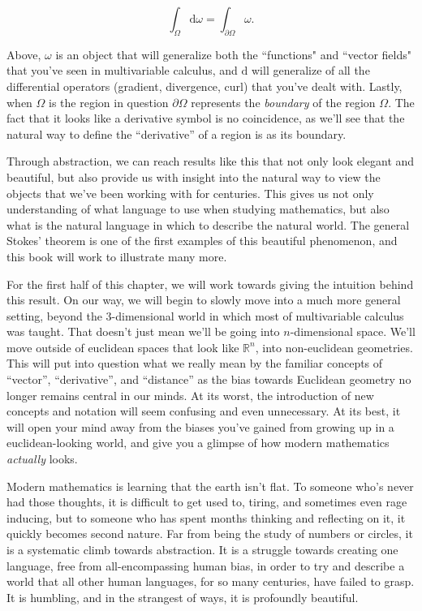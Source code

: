 \documentclass[../master.tex]{subfiles}
\begin{document}
	\begin{equation} \label{eq:GeneralStokes}
		\int_\Omega \mathrm d \omega = \int_{\partial \Omega} \omega.
	\end{equation}
	
	Above, $\omega$ is an object that will generalize both the ``functions" and ``vector fields" that you've seen in multivariable calculus, and $\mathrm d$ will generalize of all the differential operators (gradient, divergence, curl) that you've dealt with. Lastly, when $\Omega$ is the region in question $\partial \Omega$ represents the \emph{boundary} of the region $\Omega$. The fact that it looks like a derivative symbol is no coincidence, as we'll see that the natural way to define the ``derivative'' of a region is as its boundary.
	
	Through abstraction, we can reach results like this that not only look elegant and beautiful, but also provide us with insight into the natural way to view the objects that we've been working with for centuries. This gives us not only understanding of what language to use when studying mathematics, but also what is the natural language in which to describe the natural world. The general Stokes' theorem is one of the first examples of this beautiful phenomenon, and this book will work to illustrate many more. 
	
	For the first half of this chapter, we will work towards giving the intuition behind  this result. On our way, we will begin to slowly move into a much more general setting, beyond the $3$-dimensional world in which most of multivariable calculus was taught. That doesn't just mean we'll be going into $n$-dimensional space. We'll move outside of euclidean spaces that look like $\mathbb{R}^n$, into non-euclidean geometries. This will put into question what we really mean by the familiar concepts of ``vector'', ``derivative'', and ``distance'' as the bias towards Euclidean geometry no longer remains central in our minds. At its worst, the introduction of new concepts and notation will seem confusing and even unnecessary. At its best, it will open your mind away from the biases you've gained from growing up in a euclidean-looking world, and give you a glimpse of how modern mathematics \emph{actually} looks. 
	
	Modern mathematics is learning that the earth isn't flat. To someone who's never had those thoughts, it is difficult to get used to, tiring, and sometimes even rage inducing, but to someone who has spent months thinking and reflecting on it, it quickly becomes second nature. Far from being the study of numbers or circles, it is a systematic climb towards abstraction.  It is a struggle towards creating one language, free from all-encompassing human bias, in order to try and describe a world that all other human languages, for so many centuries, have failed to grasp. It is humbling, and in the strangest of ways, it is profoundly beautiful.
\end{document}
